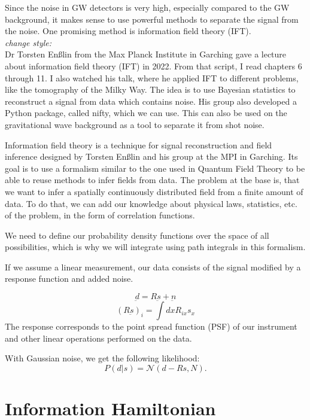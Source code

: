 Since the noise in GW detectors is very high, especially compared to the GW background, it makes sense to use powerful methods to separate the signal from the noise. One promising method is information field theory (IFT).
\\
\textit{change style:}
\\
Dr Torsten Enßlin from the Max Planck Institute in Garching gave a lecture about 
information field theory (IFT) in 2022. From that script, I read chapters 6 through 11. 
I also watched his talk, where he applied IFT to different problems, like the
tomography of the Milky Way.  The idea is to use Bayesian statistics to reconstruct 
a signal from data which contains noise. His group also developed a Python package, 
called nifty, which we can use. This can also be used on the gravitational wave 
background as a tool to separate it from shot noise.


Information field theory is a technique for signal reconstruction
and field inference designed by Torsten Enßlin and his group at the 
MPI in Garching.
Its goal is to use a formalism similar to the one used in Quantum Field
Theory to be able to reuse methods to infer fields from data. The problem
at the base is, that we want to infer a spatially continuously distributed field
from a finite amount of data. To do that, we can add our knowledge about 
physical laws, statistics, etc. of the problem, in the form of correlation functions.

We need to define our probability density functions over the space of all
possibilities, which is why we will integrate using path integrals in 
this formalism.

If we assume a linear measurement, our data consists of the signal modified by a response function and added noise.

\begin{equation}
    \underbar{d} = R\underbar{s} +\underbar{n}
\end{equation}
\begin{equation}
    (R\underbar{s})_i = \int dx R_{ix} s_{x}
\end{equation}
The response corresponds to the point spread function (PSF) of our instrument and
other linear operations performed on the data.

With Gaussian noise, we get the following likelihood:
\begin{equation}
    P(d|s) = \mathcal{N}(d-Rs, N) .
\end{equation}

\section{Information Hamiltonian}

